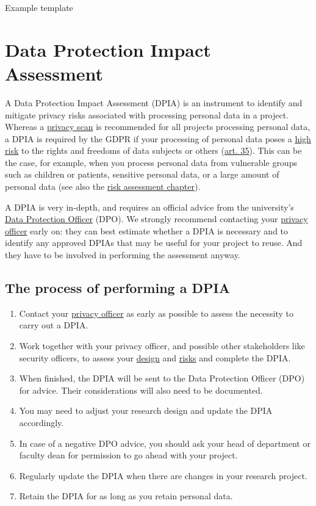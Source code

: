 \documentclass[
]{book}
\providecommand{\tightlist}{%
  \setlength{\itemsep}{0pt}\setlength{\parskip}{0pt}}
\begin{document}
Example template

\hypertarget{dpia}{%
\section{Data Protection Impact Assessment}\label{dpia}}

A Data Protection Impact Assessment (DPIA) is an instrument to identify and
mitigate privacy risks associated with processing personal data in a project.
Whereas a \protect\hyperlink{privacy-scan}{privacy scan} is recommended for all projects
processing personal data, a DPIA is required by the GDPR if your processing of
personal data poses a \protect\hyperlink{high-risk-processing}{high risk} to the rights and
freedoms of data subjects or others
(\href{https://gdpr-info.eu/art-35-gdpr/}{art. 35}). This can be the
case, for example, when you process personal data from vulnerable groups such
as children or patients, sensitive personal data, or a large amount of personal
data (see also the \protect\hyperlink{risk-assessment}{risk assessment chapter}).

A DPIA is very in-depth, and requires an official advice from the university's
\href{https://intranet.uu.nl/en/knowledgebase/data-protection-officer}{Data Protection Officer}
(DPO). We strongly recommend contacting your \protect\hyperlink{support}{privacy officer}
early on: they can best estimate whether a DPIA is necessary and to identify
any approved DPIAs that may be useful for your project to reuse. And they have
to be involved in performing the assessment anyway.

\hypertarget{dpia-process}{%
\subsection{The process of performing a DPIA}\label{dpia-process}}

\begin{enumerate}
\def\labelenumi{\arabic{enumi}.}
\tightlist
\item
  Contact your \protect\hyperlink{support}{privacy officer} as early as possible to assess the
  necessity to carry out a DPIA.
\item
  Work together with your privacy officer, and possible other stakeholders like
  security officers, to assess your \protect\hyperlink{privacy-by-design}{design} and
  \protect\hyperlink{risk-assessment}{risks} and complete the DPIA.
\item
  When finished, the DPIA will be sent to the Data Protection Officer (DPO) for
  advice. Their considerations will also need to be documented.
\item
  You may need to adjust your research design and update the DPIA accordingly.
\item
  In case of a negative DPO advice, you should ask your head of department or
  faculty dean for permission to go ahead with your project.
\item
  Regularly update the DPIA when there are changes in your research project.
\item
  Retain the DPIA for as long as you retain personal data.
\end{enumerate}
\end{document}
